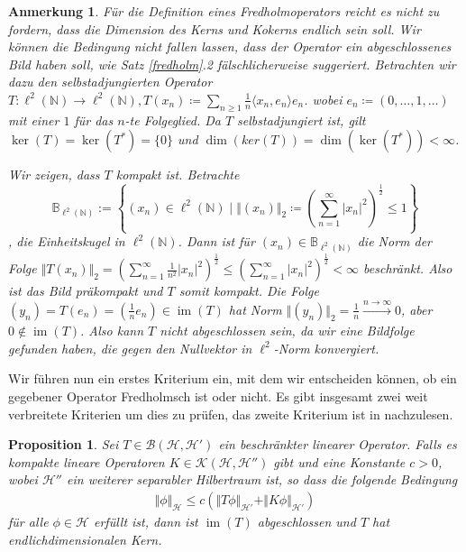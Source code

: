 \documentclass[11pt, hidelinks]{article}
\newcommand{\h}{\mathcal{H}}
\newcommand{\im}{\operatorname{im}}
\numberwithin{conj}{section}
\newtheorem{remark}[conj]{Anmerkung}
\newtheorem{proposition}[conj]{Proposition}
\begin{document}
\begin{remark}
Für die Definition eines Fredholmoperators reicht es nicht zu fordern, dass die Dimension des Kerns und Kokerns endlich sein soll. Wir können die Bedingung nicht fallen lassen, dass der Operator ein abgeschlossenes Bild haben soll, wie Satz \ref{fredholm}.2 fälschlicherweise suggeriert. Betrachten wir dazu den selbstadjungierten Operator $T: \ell^2(\mathbb{N}) \to \ell^2(\mathbb{N}), T(x_n) \coloneq \sum_{n \geq 1} \frac{1}{n} \langle x_n,e_n \rangle e_n$. wobei $e_n \coloneq (0, \ldots, 1, \ldots)$ mit einer $1$ für das $n$-te Folgeglied. Da $T$ selbstadjungiert ist, gilt $\ker(T) = \ker(T^\ast) = \{0\}$ und $\dim(ker(T)) = \dim(\ker(T^\ast)) < \infty$. 

Wir zeigen, dass $T$ kompakt ist. Betrachte $$\mathbb{B}_{\ell^2(\mathbb{N})} := \left\{ (x_n) \in \ell^2(\mathbb{N}) \; \bigg\vert \; \Vert (x_n) \Vert_2 \coloneq \left(\sum_{n=1}^{\infty} \vert x_n \vert^2\right)^{\frac{1}{2}} \leq 1 \right\}$$, die Einheitskugel in $\ell^2(\mathbb{N})$. Dann ist für $(x_n) \in \mathbb{B}_{\ell^2(\mathbb{N})}$ die Norm der Folge $\Vert T(x_n) \Vert_2 = (\sum_{n=1}^\infty \frac{1}{n^2} \vert x_n \vert^2)^\frac{1}{2} \leq (\sum_{n=1}^\infty \vert x_n \vert^2)^\frac{1}{2} < \infty$ beschränkt. Also ist das Bild präkompakt und $T$ somit kompakt. Die Folge $(y_n) = T(e_n) = (\frac{1}{n}e_n) \in \im(T)$ hat Norm $\Vert (y_n) \Vert_2 = \frac{1}{n} \xrightarrow[]{n \to \infty} 0$, aber $0 \notin \im(T)$. Also kann $T$ nicht abgeschlossen sein, da wir eine Bildfolge gefunden haben, die gegen den Nullvektor in $\ell^2$-Norm konvergiert.
\end{remark}

Wir führen nun ein erstes Kriterium ein, mit dem wir entscheiden können, ob ein gegebener Operator Fredholmsch ist oder nicht. Es gibt insgesamt zwei weit verbreitete Kriterien um dies zu prüfen, das zweite Kriterium ist in \cite[Theorem 3.4.1]{doll2023spectral} nachzulesen.

\begin{proposition}
    Sei $T \in \mathcal{B}(\h,\h')$ ein beschränkter linearer Operator. Falls es kompakte lineare Operatoren $K \in \mathcal{K}(\h,\h'')$ gibt und eine Konstante $c > 0$, wobei $\h''$ ein weiterer separabler Hilbertraum ist, so dass die folgende Bedingung
    \begin{align}
        \Vert\phi\Vert_\h \leq c (\Vert T\phi \Vert_{\h'} + \Vert K\phi \Vert_{\h'})
    \end{align}
    für alle $\phi \in \h$ erfüllt ist, dann ist $\im(T)$ abgeschlossen und $T$ hat endlichdimensionalen Kern.
\end{proposition}
\end{document}
